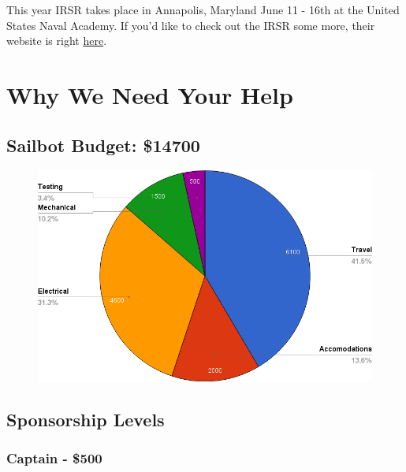 \documentclass{article}
\begin{document}
This year IRSR takes place in Annapolis, Maryland June 11 - 16th at the United 
States Naval Academy. If you'd like to check out the IRSR some more, their 
website is right \href{http://sailbot.org}{here}.

\newpage

\section*{Why We Need Your Help}



\subsection*{Sailbot Budget: \$14700}

\begin{figure}[H]
    \centering
    \includegraphics[scale=0.5]{budget.png}
\end{figure}

\newpage

\subsection*{Sponsorship Levels}

\subsubsection*{Captain - \$500}
\end{document}
